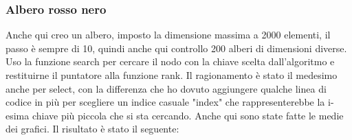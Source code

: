     \vspace{1cm}
    
    \subsubsection{Albero rosso nero}
    Anche qui creo un albero, imposto la dimensione massima a 2000 elementi, il passo è sempre di 10, quindi anche qui controllo 200 alberi di dimensioni diverse. Uso la funzione search per cercare il nodo con la chiave scelta dall'algoritmo e restituirne il puntatore alla funzione rank. 
    Il ragionamento è stato il medesimo anche per select, con la differenza che ho dovuto aggiungere qualche linea di codice in più per scegliere un indice casuale "index" che rappresenterebbe la i-esima chiave più piccola che si sta cercando. Anche qui sono state fatte le medie dei grafici.
    Il risultato è stato il seguente:

